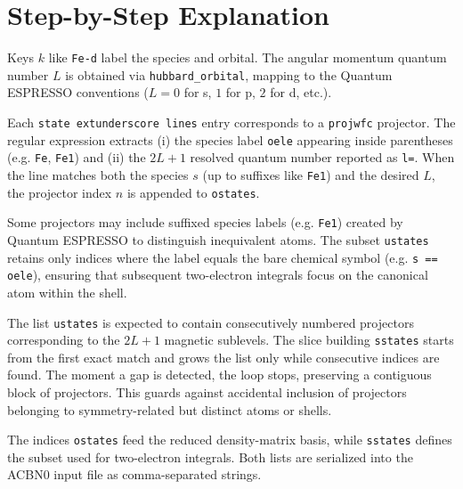 \documentclass[11pt]{article}
\begin{document}
\section{Step-by-Step Explanation}
\begin{description}[leftmargin=0pt,labelindent=1.5em]
  \item[Iteration over shells:] Keys \(k\) like \texttt{Fe-d} label the species and orbital. The angular momentum quantum number \(L\) is obtained via \verb|hubbard_orbital|, mapping to the Quantum ESPRESSO conventions (\(L=0\) for s, \(1\) for p, \(2\) for d, etc.).
  \item[Projector scanning:] Each \texttt{state	extunderscore lines} entry corresponds to a \texttt{projwfc} projector. The regular expression extracts (i) the species label \verb|oele| appearing inside parentheses (e.g.	\texttt{Fe}, \texttt{Fe1}) and (ii) the \(2L\!+\!1\) resolved quantum number reported as \verb|l=|. When the line matches both the species \(s\) (up to suffixes like \texttt{Fe1}) and the desired \(L\), the projector index \(n\) is appended to \verb|ostates|.
  \item[Exact species matches:] Some projectors may include suffixed species labels (e.g.	\texttt{Fe1}) created by Quantum ESPRESSO to distinguish inequivalent atoms. The subset \verb|ustates| retains only indices where the label equals the bare chemical symbol (e.g.	\verb|s == oele|), ensuring that subsequent two-electron integrals focus on the canonical atom within the shell.
  \item[Contiguity enforcement:] The list \verb|ustates| is expected to contain consecutively numbered projectors corresponding to the \(2L\!+\!1\) magnetic sublevels. The slice building \verb|sstates| starts from the first exact match and grows the list only while consecutive indices are found. The moment a gap is detected, the loop stops, preserving a contiguous block of projectors. This guards against accidental inclusion of projectors belonging to symmetry-related but distinct atoms or shells.
  \item[Outputs:] The indices \verb|ostates| feed the reduced density-matrix basis, while \verb|sstates| defines the subset used for two-electron integrals. Both lists are serialized into the ACBN0 input file as comma-separated strings.
\end{description}
\end{document}
